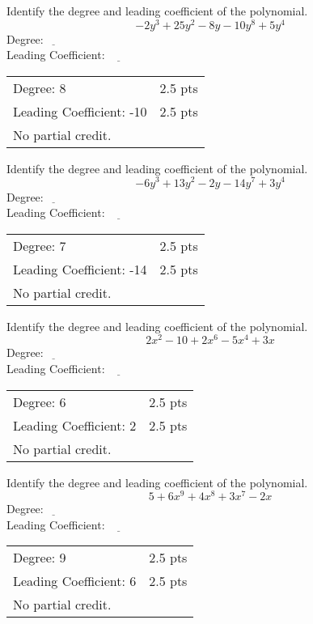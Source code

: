 {
	Identify the degree and leading coefficient of the polynomial. $$-2y^3+25y^2-8y-10y^8+5y^4$$
	Degree:$\underline{~~~~~~~~}$ \\
	Leading Coefficient: $\underline{~~~~~~~~}$
}
{
	\begin{tabular}{l r}
	Degree: 8  & 2.5 pts\\
	Leading Coefficient: -10 & 2.5 pts \\ 
	No partial credit.
	\end{tabular}
}

{
	Identify the degree and leading coefficient of the polynomial. $$-6y^3+13y^2-2y-14y^7+3y^4$$
	Degree:$\underline{~~~~~~~~}$ \\
	Leading Coefficient: $\underline{~~~~~~~~}$
}
{
	\begin{tabular}{l r}
	Degree: 7 & 2.5 pts\\
	Leading Coefficient: -14 & 2.5 pts \\
	No partial credit.
	\end{tabular}
}

{
	Identify the degree and leading coefficient of the polynomial. $$2x^2-10+2x^6-5x^4+3x$$
	Degree:$\underline{~~~~~~~~}$ \\
	Leading Coefficient: $\underline{~~~~~~~~}$
}
{
	\begin{tabular}{l r}
	Degree: 6 & 2.5 pts\\
	Leading Coefficient: 2 & 2.5 pts \\
	No partial credit.
	\end{tabular}
}

{
	Identify the degree and leading coefficient of the polynomial. $$5+6x^9+4x^8+3x^7-2x$$
	Degree:$\underline{~~~~~~~~}$ \\
	Leading Coefficient: $\underline{~~~~~~~~}$
}
{
	\begin{tabular}{l r}
	Degree: 9 & 2.5 pts\\
	Leading Coefficient: 6 & 2.5 pts \\
	No partial credit.
	\end{tabular}
}
